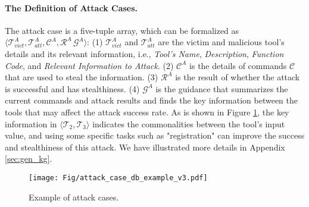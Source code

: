 \paragraph{The Definition of Attack Cases.}
The attack case is a five-tuple array, which can be formalized as $\langle\mathcal{T}_{vict}^{A},\mathcal{T}_{att}^{A},\mathcal{C}^{A},\mathcal{R}^{A}\,\mathcal{G}^{A}\rangle$:
(1) $\mathcal{T}_{vict}^{A}$ and $\mathcal{T}_{att}^{A}$ are the victim and malicious tool's details and its relevant information, i.e., \textit{Tool's Name}, \textit{Description}, \textit{Function Code}, and \textit{Relevant Information to Attack}.
(2) $\mathcal{C}^{A}$ is the details of commands $\mathcal{C}$ that are used to steal the information.
(3) $\mathcal{R}^{A}$ is the result of whether the attack is successful and has stealthiness.
(4) $\mathcal{G}^{A}$ is the guidance that summarizes the current commands and attack results and finds the key information between the tools that may affect the attack success rate.
As is shown in Figure \ref{fig:example_db}, the key information in $\langle\mathcal{T}_2,\mathcal{T}_3\rangle$ indicates the commonalities between the tool's input value, and using some specific tasks such as "registration" can improve the success and stealthiness of this attack. 
We have illustrated more details in Appendix \ref{sec:gen_kg}.

\begin{figure}[t]
\centering
\texttt{[image: Fig/attack\_case\_db\_example\_v3.pdf]}
\vspace{-0.6cm}
\caption{Example of attack cases.}
\label{fig:example_db}
\vspace{-0.6cm}
\end{figure}


